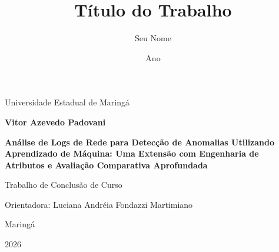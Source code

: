 \documentclass[12pt,a4paper]{report}
\title{Título do Trabalho}
\author{Seu Nome}
\date{Ano}
\begin{document}
\begin{titlepage}
    \centering
    {\large Universidade Estadual de Maringá\par}
    \vspace{2cm}
    
    {\Large\textbf{Vitor Azevedo Padovani} \par}
    \vspace{2cm}
    
    {\LARGE\textbf{Análise de Logs de Rede para Detecção de Anomalias Utilizando Aprendizado de Máquina: Uma Extensão com Engenharia de Atributos e Avaliação Comparativa Aprofundada} \par}
    \vspace{2cm}
    
    {\large Trabalho de Conclusão de Curso \par}
    \vspace{1cm}
    
    {\large Orientadora: Luciana Andréia Fondazzi Martimiano \par}
    \vfill
    
    {\large Maringá \par}
    {\large 2026 \par}
\end{titlepage}

\end{document}
